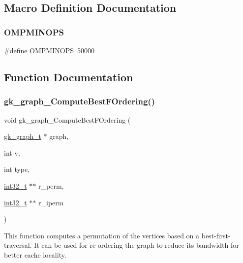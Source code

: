\subsection{Macro Definition Documentation}
\mbox{\label{a00846_afbb5013b831efde4d664bae299d7d2ee}} 
\subsubsection{\texorpdfstring{O\+M\+P\+M\+I\+N\+O\+PS}{OMPMINOPS}}
{\footnotesize\ttfamily \#define O\+M\+P\+M\+I\+N\+O\+PS~50000}



\subsection{Function Documentation}
\mbox{\label{a00846_ab06073efcea470e57620d447548b2aca}} 
\subsubsection{\texorpdfstring{gk\+\_\+graph\+\_\+\+Compute\+Best\+F\+Ordering()}{gk\_graph\_ComputeBestFOrdering()}}
{\footnotesize\ttfamily void gk\+\_\+graph\+\_\+\+Compute\+Best\+F\+Ordering (\begin{DoxyParamCaption}\item[{\hyperlink{a00638}{gk\+\_\+graph\+\_\+t} $\ast$}]{graph,  }\item[{int}]{v,  }\item[{int}]{type,  }\item[{\hyperlink{a00119_a37994e3b11c72957c6f454c6ec96d43d}{int32\+\_\+t} $\ast$$\ast$}]{r\+\_\+perm,  }\item[{\hyperlink{a00119_a37994e3b11c72957c6f454c6ec96d43d}{int32\+\_\+t} $\ast$$\ast$}]{r\+\_\+iperm }\end{DoxyParamCaption})}

This function computes a permutation of the vertices based on a best-\/first-\/traversal. It can be used for re-\/ordering the graph to reduce its bandwidth for better cache locality.


